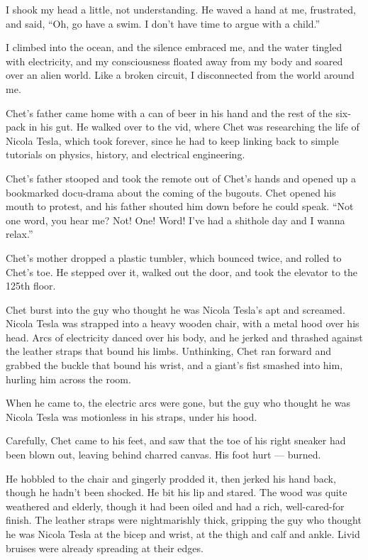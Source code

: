 I shook my head a little, not understanding. He waved a hand at me,
frustrated, and said,
``Oh, go have a swim. I don't have time to argue with a child.''

I climbed into the ocean, and the silence embraced me, and the
water tingled with electricity, and my consciousness floated away
from my body and soared over an alien world. Like a broken circuit,
I disconnected from the world around me.

\tb

Chet's father came home with a can of beer in his hand and the rest
of the six-pack in his gut. He walked over to the vid, where Chet
was researching the life of Nicola Tesla, which took forever, since
he had to keep linking back to simple tutorials on physics,
history, and electrical engineering.

Chet's father stooped and took the remote out of Chet's hands and
opened up a bookmarked docu-drama about the coming of the bugouts.
Chet opened his mouth to protest, and his father shouted him down
before he could speak.
``Not one word, you hear me? Not! One! Word! I've had a shithole day and I 
wanna relax.''

Chet's mother dropped a plastic tumbler, which bounced twice, and
rolled to Chet's toe. He stepped over it, walked out the door, and
took the elevator to the 125th floor.

Chet burst into the guy who thought he was Nicola Tesla's apt and
screamed. Nicola Tesla was strapped into a heavy wooden chair, with
a metal hood over his head. Arcs of electricity danced over his
body, and he jerked and thrashed against the leather straps that
bound his limbs. Unthinking, Chet ran forward and grabbed the
buckle that bound his wrist, and a giant's fist smashed into him,
hurling him across the room.

When he came to, the electric arcs were gone, but the guy who
thought he was Nicola Tesla was motionless in his straps, under his
hood.

Carefully, Chet came to his feet, and saw that the toe of his right
sneaker had been blown out, leaving behind charred canvas. His foot
hurt --- burned.

He hobbled to the chair and gingerly prodded it, then jerked his
hand back, though he hadn't been shocked. He bit his lip and
stared. The wood was quite weathered and elderly, though it had
been oiled and had a rich, well-cared-for finish. The leather
straps were nightmarishly thick, gripping the guy who thought he
was Nicola Tesla at the bicep and wrist, at the thigh and calf and
ankle. Livid bruises were already spreading at their edges.

